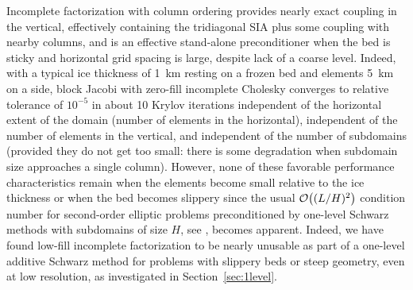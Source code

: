Incomplete factorization with column ordering provides nearly exact coupling in the vertical, effectively containing the tridiagonal SIA plus some coupling with nearby columns, and is an effective stand-alone preconditioner when the bed is sticky and horizontal grid spacing is large, despite lack of a coarse level.
Indeed, with a typical ice thickness of \SI{1}{\kilo\metre} resting on a frozen bed and elements \SI{5}{\kilo\metre} on
a side, block Jacobi with zero-fill incomplete Cholesky converges to relative tolerance of $10^{-5}$
in about 10 Krylov iterations independent of the horizontal extent of the domain (number of elements
in the horizontal), independent of the number of elements in the vertical, and independent of the
number of subdomains (provided they do not get too small: there is some degradation when subdomain
size approaches a single column).  However, none of these favorable performance characteristics
remain when the elements become small relative to the ice thickness or when the bed becomes
slippery since the usual ${\mathcal{O}}\big((L/H)^2\big)$ condition number for second-order elliptic problems
preconditioned by one-level Schwarz methods with subdomains of size $H$, see \citet{smith1996domain}, becomes apparent.
Indeed, we have found low-fill incomplete factorization to be nearly unusable as part of a one-level additive Schwarz method for problems with slippery beds or steep geometry, even at low resolution, as investigated in Section~\ref{sec:1level}.

